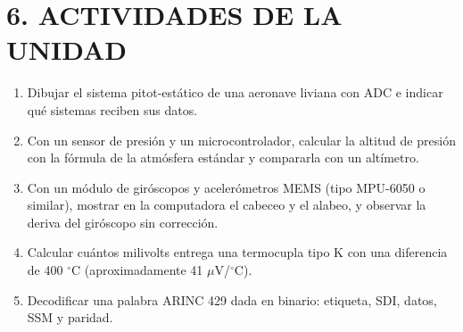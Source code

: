 \section*{6. ACTIVIDADES DE LA UNIDAD}
\begin{enumerate}
  \item Dibujar el sistema pitot-estático de una aeronave liviana con ADC e indicar qué sistemas
        reciben sus datos.
  \item Con un sensor de presión y un microcontrolador, calcular la altitud de presión con la
        fórmula de la atmósfera estándar y compararla con un altímetro.
  \item Con un módulo de giróscopos y acelerómetros MEMS (tipo MPU-6050 o similar), mostrar en la
        computadora el cabeceo y el alabeo, y observar la deriva del giróscopo sin corrección.
  \item Calcular cuántos milivolts entrega una termocupla tipo K con una diferencia de 400 $^\circ$C
        (aproximadamente 41 $\mu$V/$^\circ$C).
  \item Decodificar una palabra ARINC 429 dada en binario: etiqueta, SDI, datos, SSM y paridad.
\end{enumerate}
